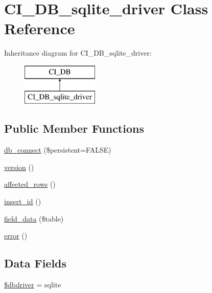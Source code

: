 \hypertarget{class_c_i___d_b__sqlite__driver}{}\section{C\+I\+\_\+\+D\+B\+\_\+sqlite\+\_\+driver Class Reference}
\label{class_c_i___d_b__sqlite__driver}
Inheritance diagram for C\+I\+\_\+\+D\+B\+\_\+sqlite\+\_\+driver\+:\begin{figure}[H]
\begin{center}
\leavevmode
\includegraphics[height=2.000000cm]{class_c_i___d_b__sqlite__driver}
\end{center}
\end{figure}
\subsection*{Public Member Functions}
\begin{DoxyCompactItemize}
\item 
\mbox{\hyperlink{class_c_i___d_b__sqlite__driver_a52bf595e79e96cc0a7c907a9b45aeb4d}{db\+\_\+connect}} (\$persistent=F\+A\+L\+SE)
\item 
\mbox{\hyperlink{class_c_i___d_b__sqlite__driver_a6080dae0886626b9a4cedb29240708b1}{version}} ()
\item 
\mbox{\hyperlink{class_c_i___d_b__sqlite__driver_a77248aaad33eb132c04cc4aa3f4bc8cb}{affected\+\_\+rows}} ()
\item 
\mbox{\hyperlink{class_c_i___d_b__sqlite__driver_a933f2cde8dc7f87875e257d0a4902e99}{insert\+\_\+id}} ()
\item 
\mbox{\hyperlink{class_c_i___d_b__sqlite__driver_a90355121e1ed009e0efdbd544ab56efa}{field\+\_\+data}} (\$table)
\item 
\mbox{\hyperlink{class_c_i___d_b__sqlite__driver_a43b8d30b879d4f09ceb059b02af2bc02}{error}} ()
\end{DoxyCompactItemize}
\subsection*{Data Fields}
\begin{DoxyCompactItemize}
\item 
\mbox{\hyperlink{class_c_i___d_b__sqlite__driver_a0cde2a16322a023d040aa7f725877597}{\$dbdriver}} = \textquotesingle{}sqlite\textquotesingle{}
\end{DoxyCompactItemize}
